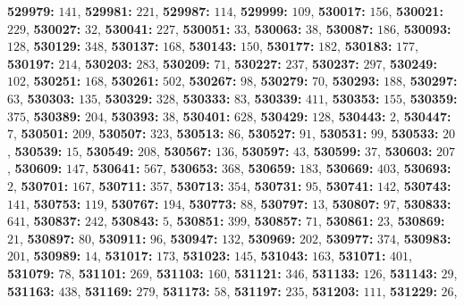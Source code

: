 \textsf{\bfseries 529979:} $141$, \textsf{\bfseries 529981:} $221$, \textsf{\bfseries 529987:} $114$, \textsf{\bfseries 529999:} $109$, \textsf{\bfseries 530017:} $156$, \textsf{\bfseries 530021:} $229$, \textsf{\bfseries 530027:} $32$, \textsf{\bfseries 530041:} $227$, \textsf{\bfseries 530051:} $33$, \textsf{\bfseries 530063:} $38$, \textsf{\bfseries 530087:} $186$, \textsf{\bfseries 530093:} $128$, \textsf{\bfseries 530129:} $348$, \textsf{\bfseries 530137:} $168$, \textsf{\bfseries 530143:} $150$, \textsf{\bfseries 530177:} $182$, \textsf{\bfseries 530183:} $177$, \textsf{\bfseries 530197:} $214$, \textsf{\bfseries 530203:} $283$, \textsf{\bfseries 530209:} $71$, \textsf{\bfseries 530227:} $237$, \textsf{\bfseries 530237:} $297$, \textsf{\bfseries 530249:} $102$, \textsf{\bfseries 530251:} $168$, \textsf{\bfseries 530261:} $502$, \textsf{\bfseries 530267:} $98$, \textsf{\bfseries 530279:} $70$, \textsf{\bfseries 530293:} $188$, \textsf{\bfseries 530297:} $63$, \textsf{\bfseries 530303:} $135$, \textsf{\bfseries 530329:} $328$, \textsf{\bfseries 530333:} $83$, \textsf{\bfseries 530339:} $411$, \textsf{\bfseries 530353:} $155$, \textsf{\bfseries 530359:} $375$, \textsf{\bfseries 530389:} $204$, \textsf{\bfseries 530393:} $38$, \textsf{\bfseries 530401:} $628$, \textsf{\bfseries 530429:} $128$, \textsf{\bfseries 530443:} $2$, \textsf{\bfseries 530447:} $7$, \textsf{\bfseries 530501:} $209$, \textsf{\bfseries 530507:} $323$, \textsf{\bfseries 530513:} $86$, \textsf{\bfseries 530527:} $91$, \textsf{\bfseries 530531:} $99$, \textsf{\bfseries 530533:} $20$, \textsf{\bfseries 530539:} $15$, \textsf{\bfseries 530549:} $208$, \textsf{\bfseries 530567:} $136$, \textsf{\bfseries 530597:} $43$, \textsf{\bfseries 530599:} $37$, \textsf{\bfseries 530603:} $207$, \textsf{\bfseries 530609:} $147$, \textsf{\bfseries 530641:} $567$, \textsf{\bfseries 530653:} $368$, \textsf{\bfseries 530659:} $183$, \textsf{\bfseries 530669:} $403$, \textsf{\bfseries 530693:} $2$, \textsf{\bfseries 530701:} $167$, \textsf{\bfseries 530711:} $357$, \textsf{\bfseries 530713:} $354$, \textsf{\bfseries 530731:} $95$, \textsf{\bfseries 530741:} $142$, \textsf{\bfseries 530743:} $141$, \textsf{\bfseries 530753:} $119$, \textsf{\bfseries 530767:} $194$, \textsf{\bfseries 530773:} $88$, \textsf{\bfseries 530797:} $13$, \textsf{\bfseries 530807:} $97$, \textsf{\bfseries 530833:} $641$, \textsf{\bfseries 530837:} $242$, \textsf{\bfseries 530843:} $5$, \textsf{\bfseries 530851:} $399$, \textsf{\bfseries 530857:} $71$, \textsf{\bfseries 530861:} $23$, \textsf{\bfseries 530869:} $21$, \textsf{\bfseries 530897:} $80$, \textsf{\bfseries 530911:} $96$, \textsf{\bfseries 530947:} $132$, \textsf{\bfseries 530969:} $202$, \textsf{\bfseries 530977:} $374$, \textsf{\bfseries 530983:} $201$, \textsf{\bfseries 530989:} $14$, \textsf{\bfseries 531017:} $173$, \textsf{\bfseries 531023:} $145$, \textsf{\bfseries 531043:} $163$, \textsf{\bfseries 531071:} $401$, \textsf{\bfseries 531079:} $78$, \textsf{\bfseries 531101:} $269$, \textsf{\bfseries 531103:} $160$, \textsf{\bfseries 531121:} $346$, \textsf{\bfseries 531133:} $126$, \textsf{\bfseries 531143:} $29$, \textsf{\bfseries 531163:} $438$, \textsf{\bfseries 531169:} $279$, \textsf{\bfseries 531173:} $58$, \textsf{\bfseries 531197:} $235$, \textsf{\bfseries 531203:} $111$, \textsf{\bfseries 531229:} $26$, 
